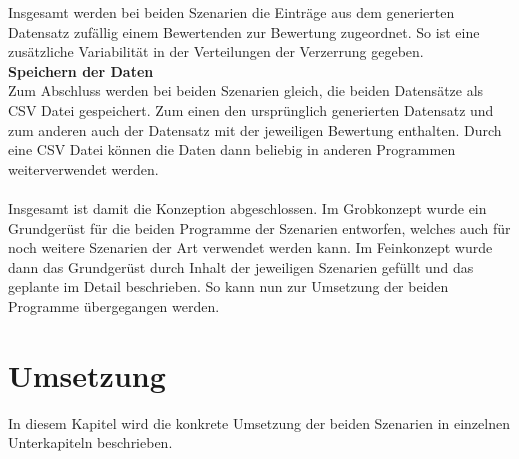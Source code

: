 \begin{onehalfspace}
Insgesamt werden bei beiden Szenarien die Einträge aus dem generierten Datensatz zufällig einem Bewertenden zur Bewertung zugeordnet. So ist eine zusätzliche Variabilität in der Verteilungen der Verzerrung gegeben.\\
\textbf{Speichern der Daten}\\
Zum Abschluss werden bei beiden Szenarien gleich, die beiden Datensätze als CSV Datei gespeichert. Zum einen den ursprünglich generierten Datensatz und zum anderen auch der Datensatz mit der jeweiligen Bewertung enthalten. Durch eine CSV Datei können die Daten dann beliebig in anderen Programmen weiterverwendet werden.\\ \\
Insgesamt ist damit die Konzeption abgeschlossen. Im Grobkonzept wurde ein Grundgerüst für die beiden Programme der Szenarien entworfen, welches auch für noch weitere Szenarien der Art verwendet werden kann. Im Feinkonzept wurde dann das Grundgerüst durch Inhalt der jeweiligen Szenarien gefüllt und das geplante im Detail beschrieben. So kann nun zur Umsetzung der beiden Programme übergegangen werden. 

\section{Umsetzung}
\label{umsetzung}
In diesem Kapitel wird die konkrete Umsetzung der beiden Szenarien in einzelnen Unterkapiteln beschrieben.

\end{onehalfspace}
